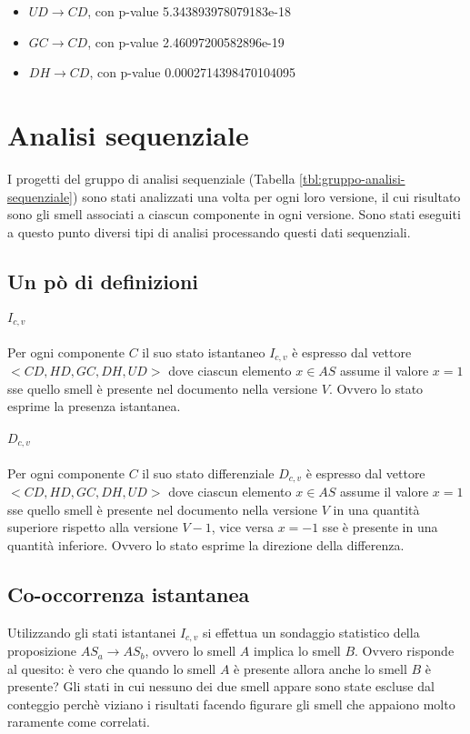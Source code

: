 \documentclass[a4paper,11pt,oneside, table]{article}
\begin{document}
  \begin{itemize}
    \item $UD \rightarrow CD$, con p-value 5.343893978079183e-18
    \item $GC \rightarrow CD$, con p-value 2.46097200582896e-19
    \item $DH \rightarrow CD$, con p-value 0.0002714398470104095
  \end{itemize}

  \section{Analisi sequenziale}

  I progetti del gruppo di analisi sequenziale (Tabella \ref{tbl:gruppo-analisi-sequenziale}) sono stati analizzati una volta per ogni loro versione, il cui risultato sono gli smell associati a ciascun componente in ogni versione. Sono stati eseguiti a questo punto diversi tipi di analisi processando questi dati sequenziali.

  \subsection{Un p\`o di definizioni}

  \paragraph{$I_{c,v}$}
  Per ogni componente $C$ il suo stato istantaneo $I_{c,v}$ \`e espresso dal vettore $<CD,HD,GC,DH,UD>$ dove ciascun elemento $x \in AS$ assume il valore $x = 1$ sse quello smell \`e presente nel documento nella versione $V$. Ovvero lo stato esprime la presenza istantanea.

  \paragraph{$D_{c,v}$}
  Per ogni componente $C$ il suo stato differenziale $D_{c,v}$ \`e espresso dal vettore $<CD,HD,GC,DH,UD>$ dove ciascun elemento $x \in AS$ assume il valore $x = 1$ sse quello smell \`e presente nel documento nella versione $V$ in una quantit\`a superiore rispetto alla versione $V-1$, vice versa $x=-1$ sse \`e presente in una quantit\`a inferiore. Ovvero lo stato esprime la direzione della differenza.

  \subsection{Co-occorrenza istantanea}
  Utilizzando gli stati istantanei $I_{c,v}$ si effettua un sondaggio statistico della proposizione $AS_{a} \rightarrow AS_{b}$, ovvero lo smell $A$ implica lo smell $B$. Ovvero risponde al quesito: \`e vero che quando lo smell $A$ \`e presente allora anche lo smell $B$ \`e presente? Gli stati in cui nessuno dei due smell appare sono state escluse dal conteggio perch\`e viziano i risultati facendo figurare gli smell che appaiono molto raramente come correlati.
\end{document}
